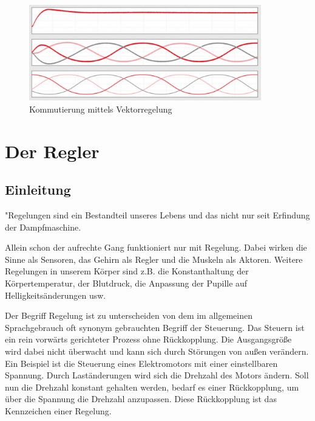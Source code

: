\begin{figure}[H]
	\begin{center}
		\includegraphics[width=0.9\textwidth]{figures/antrieb/Kommutierung_Vektorregelung.png}
		\caption{Kommutierung mittels Vektorregelung \cite{Feldorientierte-Antriebssteuerung}}
	\end{center}
\end{figure}


\newpage



\section{Der Regler}
\subsection{Einleitung}
"Regelungen sind ein Bestandteil unseres Lebens und das nicht nur seit Erfindung der Dampfmaschine.

Allein schon der aufrechte Gang funktioniert nur mit Regelung. Dabei wirken die Sinne als Sensoren, das Gehirn als Regler und die Muskeln als Aktoren. Weitere Regelungen in unserem Körper sind z.B. die Konstanthaltung der Körpertemperatur, der Blutdruck, die Anpassung der Pupille auf Helligkeitsänderungen usw.

Der Begriff Regelung ist zu unterscheiden von dem im allgemeinen Sprachgebrauch oft synonym gebrauchten Begriff der Steuerung. Das Steuern ist ein rein vorwärts gerichteter Prozess ohne Rückkopplung. Die Ausgangsgröße wird dabei nicht überwacht und kann sich durch Störungen von außen verändern. Ein Beispiel ist die Steuerung eines Elektromotors mit einer einstellbaren Spannung. Durch Laständerungen wird sich die Drehzahl des Motors ändern. Soll nun die Drehzahl konstant gehalten werden, bedarf es einer Rückkopplung, um über die Spannung die Drehzahl anzupassen. Diese Rückkopplung ist das Kennzeichen einer Regelung.

